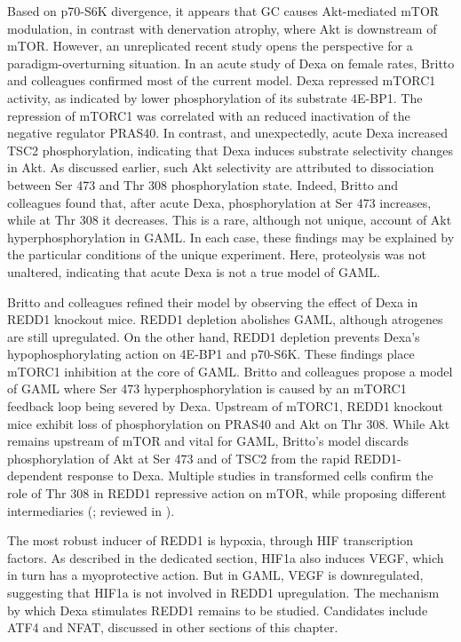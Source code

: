 \documentclass[12pt,english]{report}\usepackage[]{graphicx}\usepackage[]{color}
\begin{document}
Based on p70-S6K divergence, it appears that GC causes Akt-mediated
mTOR modulation, in contrast with denervation atrophy, where Akt is
downstream of mTOR. However, an unreplicated recent study opens the
perspective for a paradigm-overturning situation. In an acute study
of Dexa on female rates, Britto and colleagues confirmed most of the
current model\citep{britto2014redd1}. Dexa repressed mTORC1 activity,
as indicated by lower phosphorylation of its substrate 4E-BP1. The
repression of mTORC1 was correlated with an reduced inactivation of
the negative regulator PRAS40. In contrast, and unexpectedly, acute
Dexa increased TSC2 phosphorylation, indicating that Dexa induces
substrate selectivity changes in Akt. As discussed earlier, such Akt
selectivity are attributed to dissociation between Ser 473 and Thr
308 phosphorylation state. Indeed, Britto and colleagues found that,
after acute Dexa, phosphorylation at Ser 473 increases, while at Thr
308 it decreases. This is a rare, although not unique, account of
Akt hyperphosphorylation in GAML. In each case, these findings may
be explained by the particular conditions of the unique experiment.
Here, proteolysis was not unaltered, indicating that acute Dexa is
not a true model of GAML.

Britto and colleagues refined their model by observing the effect
of Dexa in REDD1 knockout mice. REDD1 depletion abolishes GAML, although
atrogenes are still upregulated. On the other hand, REDD1 depletion
prevents Dexa's hypophosphorylating action on 4E-BP1 and p70-S6K.
These findings place mTORC1 inhibition at the core of GAML. Britto
and colleagues propose a model of GAML where Ser 473 hyperphosphorylation
is caused by an mTORC1 feedback loop being severed by Dexa. Upstream
of mTORC1, REDD1 knockout mice exhibit loss of phosphorylation on
PRAS40 and Akt on Thr 308. While Akt remains upstream of mTOR and
vital for GAML, Britto's model discards phosphorylation of Akt at
Ser 473 and of TSC2 from the rapid REDD1-dependent response to Dexa.
Multiple studies in transformed cells confirm the role of Thr 308
in REDD1 repressive action on mTOR, while proposing different intermediaries
(\citep{dennis2014redd1}; reviewed in \citep{canal2014rtp801/redd1:}).

The most robust inducer of REDD1 is hypoxia, through HIF transcription
factors\citep{canal2014rtp801/redd1:}. As described in the dedicated
section, HIF1a also induces VEGF, which in turn has a myoprotective
action. But in GAML, VEGF is downregulated\citep{barel2010exercise},
suggesting that HIF1a is not involved in REDD1 upregulation. The mechanism
by which Dexa stimulates REDD1 remains to be studied. Candidates include
ATF4 and NFAT, discussed in other sections of this chapter.
\end{document}
